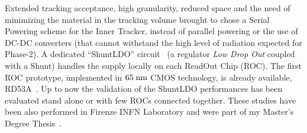 \documentclass[a4paper,11pt,english]{article}
\begin{document}
\begin{description}[style=unboxed,leftmargin=.2cm]
\item[Studies of Serial Powering for Phase-2 Inner Tracker upgrade.] Extended tracking acceptance, high granularity, reduced space and the need of minimizing the material in the tracking volume brought to chose a Serial Powering scheme for the Inner Tracker, instead of parallel powering or the use of \mbox{DC-DC} converters (that cannot withstand the high level of radiation expected for Phase-2).
A dedicated ``ShuntLDO'' circuit~\cite{SLDO} (a regulator \textit{Low Drop Out} coupled with a Shunt) handles the supply locally on each ReadOut Chip (ROC). The first ROC prototype, implemented in $65\rm \; nm$ CMOS technology, is already available, RD53A~\cite{RD53A}. 
Up to now the validation of the ShuntLDO performances has been evaluated stand alone or with few ROCs connected together. 
These studies have been also performed in Firenze INFN Laboratory and were part of my Master's Degree Thesis~\cite{tesi}.
\begin{siderules}
\end{siderules}
\end{description}
\end{document}
